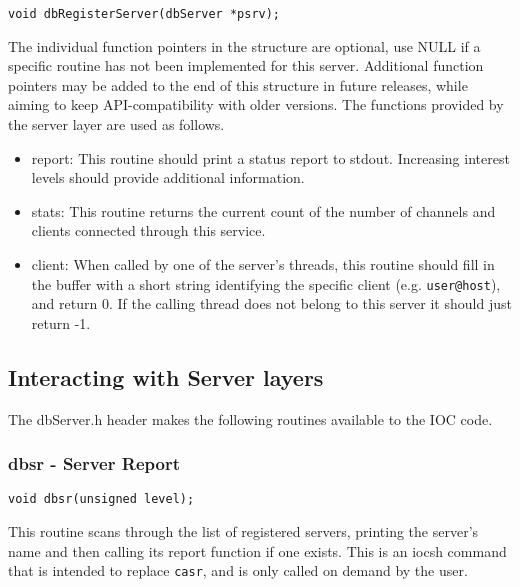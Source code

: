 \begin{verbatim}
void dbRegisterServer(dbServer *psrv);
\end{verbatim}

The individual function pointers in the structure are optional, use NULL if a specific routine has not been implemented for this server.
Additional function pointers may be added to the end of this structure in future releases, while aiming to keep API-compatibility with older versions.
The functions provided by the server layer are used as follows.

\begin{itemize}

\item {}report: This routine should print a status report to stdout. Increasing interest levels should provide additional information.

\item {}stats: This routine returns the current count of the number of channels and clients connected through this service.

\item {}client: When called by one of the server's threads, this routine should fill in the buffer with a short string identifying the specific client (e.g. \verb|user@host|), and return 0. If the calling thread does not belong to this server it should just return -1.

\end{itemize}

\subsection{Interacting with Server layers}

The dbServer.h header makes the following routines available to the IOC code.

\subsubsection{dbsr - Server Report}

\begin{verbatim}
void dbsr(unsigned level);
\end{verbatim}

This routine scans through the list of registered servers, printing the server's name and then calling its report function if one exists.
This is an iocsh command that is intended to replace \verb|casr|, and is only called on demand by the user.

